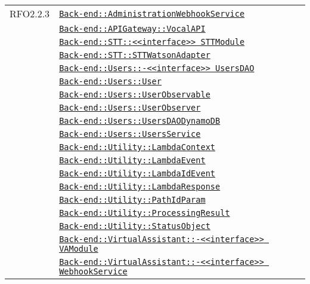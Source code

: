 \begin{longtable}{|>{\centering}m{3cm}|m{10cm}<{\centering}|}
RFO2.2.3 & \hyperref[Back-end::AdministrationWebhookService]{\texttt{Back-end::AdministrationWebhookService}}\\
& \hyperref[Back-end::APIGateway::VocalAPI]{\texttt{Back-end::APIGateway::VocalAPI}}\\
& \hyperref[Back-end::STT::<<interface>> STTModule]{\texttt{Back-end::STT::<<interface>> STTModule}}\\
& \hyperref[Back-end::STT::STTWatsonAdapter]{\texttt{Back-end::STT::STTWatsonAdapter}}\\
& \hyperref[Back-end::Users::<<interface>> UsersDAO]{\texttt{Back-end::Users::-\linebreak <<interface>> UsersDAO}}\\
& \hyperref[Back-end::Users::User]{\texttt{Back-end::Users::User}}\\
& \hyperref[Back-end::Users::UserObservable]{\texttt{Back-end::Users::UserObservable}}\\
& \hyperref[Back-end::Users::UserObserver]{\texttt{Back-end::Users::UserObserver}}\\
& \hyperref[Back-end::Users::UsersDAODynamoDB]{\texttt{Back-end::Users::UsersDAODynamoDB}}\\
& \hyperref[Back-end::Users::UsersService]{\texttt{Back-end::Users::UsersService}}\\
& \hyperref[Back-end::Utility::LambdaContext]{\texttt{Back-end::Utility::LambdaContext}}\\
& \hyperref[Back-end::Utility::LambdaEvent]{\texttt{Back-end::Utility::LambdaEvent}}\\
& \hyperref[Back-end::Utility::LambdaIdEvent]{\texttt{Back-end::Utility::LambdaIdEvent}}\\
& \hyperref[Back-end::Utility::LambdaResponse]{\texttt{Back-end::Utility::LambdaResponse}}\\
& \hyperref[Back-end::Utility::PathIdParam]{\texttt{Back-end::Utility::PathIdParam}}\\
& \hyperref[Back-end::Utility::ProcessingResult]{\texttt{Back-end::Utility::ProcessingResult}}\\
& \hyperref[Back-end::Utility::StatusObject]{\texttt{Back-end::Utility::StatusObject}}\\
& \hyperref[Back-end::VirtualAssistant::<<interface>> VAModule]{\texttt{Back-end::VirtualAssistant::-\linebreak <<interface>> VAModule}}\\
& \hyperref[Back-end::VirtualAssistant::<<interface>> WebhookService]{\texttt{Back-end::VirtualAssistant::-\linebreak <<interface>> WebhookService}}\\

\end{longtable}
